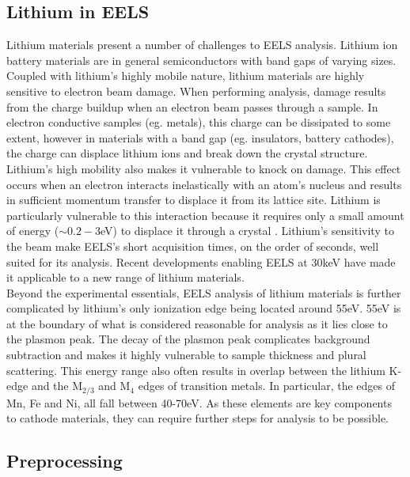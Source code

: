 \subsection{Lithium in EELS}
Lithium materials present a number of challenges to EELS analysis.  Lithium ion battery materials are in general semiconductors with band gaps of varying sizes. Coupled with lithium's highly mobile nature, lithium materials are highly sensitive to electron beam damage.  When performing analysis, damage results from the charge buildup when an electron beam passes through a sample.  In electron conductive samples (eg. metals), this charge can be dissipated to some extent, however in materials with a band gap (eg. insulators, battery cathodes), the charge can displace lithium ions and break down the crystal structure.  Lithium's high mobility also makes it vulnerable to knock on damage.  This effect occurs when an electron interacts inelastically with an atom's nucleus and results in sufficient momentum transfer to displace it from its lattice site.  Lithium is particularly vulnerable to this interaction because it requires only a small amount of energy ($ \sim 0.2-3$eV) to displace it through a crystal \cite{kang_factors_2006}.  Lithium's sensitivity to the beam make EELS's short acquisition times, on the order of seconds, well suited for its analysis. Recent developments enabling EELS at 30keV have made it applicable to a new range of lithium materials.\\  

Beyond the experimental essentials, EELS analysis of lithium materials is further complicated by lithium's only ionization edge being located around 55eV.  55eV is at the boundary of what is considered reasonable for analysis as it lies close to the plasmon peak. The decay of the plasmon peak complicates background subtraction and makes it highly vulnerable to sample thickness and plural scattering.  This energy range also often results in overlap between the lithium K-edge and the $\mathrm{M_{2 / 3}}$ and $\mathrm{M_4}$ edges of transition metals. In particular, the edges of Mn, Fe and Ni, all fall between 40-70eV.  As these elements are key components to cathode materials, they can require further steps for analysis to be possible.



\subsection{Preprocessing}

